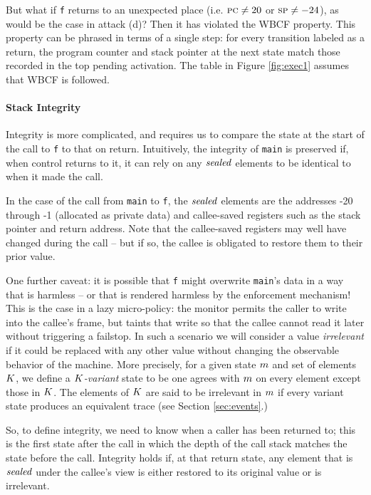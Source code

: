 \documentclass[10pt,conference]{ieeetran}%
\theoremstyle{definition}
\begin{document}
But what if {\tt f} returns to an unexpected place (i.e. \(\textsc{pc} \neq 20\) or \(\textsc{sp} \neq -24\)),
as would be the case in attack (d)? Then it has violated the WBCF property.
This property can be phrased in terms of a single step: for every transition
labeled as a return, the program counter and stack pointer at the next state
match those recorded in the top pending activation. The table in Figure \ref{fig:exec1}
assumes that WBCF is followed.

\paragraph*{Stack Integrity}

Integrity is more complicated, and requires us to compare the state at the start of
the call to {\tt f} to that on return. Intuitively, the integrity of {\tt main}
is preserved if, when control returns to it, it can rely on any \(\mathit{sealed}\) elements
to be identical to when it made the call.

In the case of the call from {\tt main} to {\tt f}, the \(\mathit{sealed}\) elements are the
addresses -20 through -1 (allocated as private data) and callee-saved registers such as
the stack pointer and return address.
Note that the callee-saved registers may well have changed during the call -- but if
so, the callee is obligated to restore them to their prior value.

One further caveat: it is possible that {\tt f} might overwrite {\tt main}'s data
in a way that is harmless -- or that is rendered harmless by the enforcement mechanism!
This is the case in a lazy micro-policy: the monitor permits the caller to write into the
callee's frame, but taints that write so that the callee cannot read it later without
triggering a failstop. In such a scenario we will consider a value {\it irrelevant}
if it could be replaced with any other value without changing the observable behavior
of the machine. More precisely, for a given state \(m\) and set of elements \(K\),
we define a {\em \(K\)-variant} state to be one agrees with \(m\) on every
element except those in \(K\). The elements of \(K\) are said to be
irrelevant in \(m\) if every variant state produces an equivalent trace
(see Section \ref{sec:events}.)

So, to define integrity, we need to know when a caller has been returned to;
this is the first state after the call in which the depth of the call stack
matches the state before the call. Integrity holds if, at that return state,
any element that is \(\mathit{sealed}\) under the callee's view is either restored
to its original value or is irrelevant.
\end{document}
